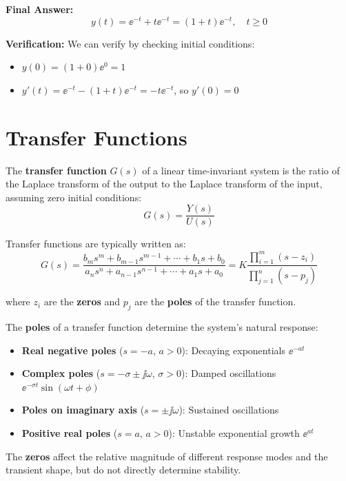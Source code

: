 \begin{examplebox}[title=Example: Solving a Second-Order ODE]
\textbf{Final Answer:}
\begin{equation}
\boxed{y(t) = \ee^{-t} + t\ee^{-t} = (1+t)\ee^{-t}, \quad t \geq 0}
\end{equation}

\textbf{Verification:} We can verify by checking initial conditions:
\begin{itemize}
    \item $y(0) = (1+0)\ee^0 = 1$ \checkmark
    \item $y'(t) = \ee^{-t} - (1+t)\ee^{-t} = -t\ee^{-t}$, so $y'(0) = 0$ \checkmark
\end{itemize}
\end{examplebox}

\section{Transfer Functions}

\begin{definitionbox}[title=Definition 0.3: Transfer Function]
The \textbf{transfer function} $G(s)$ of a linear time-invariant system is the ratio of the Laplace transform of the output to the Laplace transform of the input, assuming zero initial conditions:
\begin{equation}
G(s) = \frac{Y(s)}{U(s)}
\end{equation}
\end{definitionbox}

Transfer functions are typically written as:
\begin{equation}
G(s) = \frac{b_ms^m + b_{m-1}s^{m-1} + \cdots + b_1s + b_0}{a_ns^n + a_{n-1}s^{n-1} + \cdots + a_1s + a_0} = K\frac{\prod_{i=1}^m (s-z_i)}{\prod_{j=1}^n (s-p_j)}
\end{equation}

where $z_i$ are the \textbf{zeros} and $p_j$ are the \textbf{poles} of the transfer function.



\begin{keyconceptbox}[title=Poles and System Behavior]
The \textbf{poles} of a transfer function determine the system's natural response:
\begin{itemize}
    \item \textbf{Real negative poles} ($s = -a$, $a > 0$): Decaying exponentials $\ee^{-at}$
    \item \textbf{Complex poles} ($s = -\sigma \pm \jj\omega$, $\sigma > 0$): Damped oscillations $\ee^{-\sigma t}\sin(\omega t + \phi)$
    \item \textbf{Poles on imaginary axis} ($s = \pm\jj\omega$): Sustained oscillations
    \item \textbf{Positive real poles} ($s = a$, $a > 0$): Unstable exponential growth $\ee^{at}$
\end{itemize}
\end{keyconceptbox}

The \textbf{zeros} affect the relative magnitude of different response modes and the transient shape, but do not directly determine stability.

